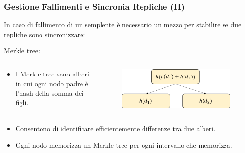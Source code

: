 \begin{frame}
  \frametitle{Gestione Fallimenti e Sincronia Repliche (II)}
    In caso di fallimento di un semplente è necessario un mezzo per stabilire se due repliche sono sincronizzare:
    \begin{block}{Merkle tree:}
    \begin{columns}
    \begin{column}{0.4\textwidth}
      \begin{itemize}
      \item I \alert{Merkle tree} sono alberi in cui ogni nodo padre è l'hash della somma dei figli.
      \end{itemize}
      \end{column}
      \begin{column}{0.5\textwidth}
        \begin{figure}
        \centering
        \includegraphics[scale=0.4]{dynamo/merkle-tree.png}
        \end{figure}
      \end{column}
    \end{columns}
    \begin{itemize}
      \item Consentono di identificare efficientemente differenze tra due alberi.
      \item Ogni nodo memorizza un Merkle tree per ogni intervallo che memorizza.
    \end{itemize}
  \end{block}
\end{frame}


